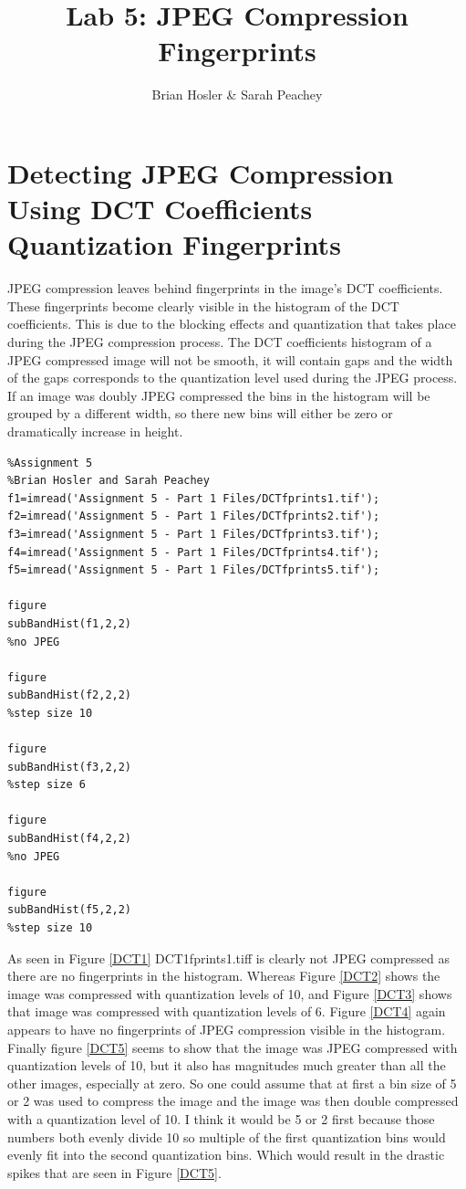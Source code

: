 \documentclass{article}
\begin{document}
\title{Lab 5: JPEG Compression Fingerprints}
\author{Brian Hosler \& Sarah Peachey }
\maketitle


\section{Detecting JPEG Compression Using DCT Coefficients Quantization
Fingerprints}

\qquad JPEG compression leaves behind fingerprints in the image's DCT coefficients.
These fingerprints become clearly visible in the histogram of the DCT coefficients. This
is due to the blocking effects and quantization that takes place during the JPEG compression
process. The DCT coefficients histogram of a JPEG compressed image will not
be smooth, it will contain gaps and the width of the gaps corresponds to the
quantization level used during the JPEG process. If an image was doubly JPEG
compressed the bins in the histogram will be grouped by a different width,
so there new bins will either be zero or dramatically increase in height. 

    
    \begin{verbatim}
%Assignment 5
%Brian Hosler and Sarah Peachey
f1=imread('Assignment 5 - Part 1 Files/DCTfprints1.tif');
f2=imread('Assignment 5 - Part 1 Files/DCTfprints2.tif');
f3=imread('Assignment 5 - Part 1 Files/DCTfprints3.tif');
f4=imread('Assignment 5 - Part 1 Files/DCTfprints4.tif');
f5=imread('Assignment 5 - Part 1 Files/DCTfprints5.tif');

figure
subBandHist(f1,2,2)
%no JPEG

figure
subBandHist(f2,2,2)
%step size 10

figure
subBandHist(f3,2,2)
%step size 6

figure
subBandHist(f4,2,2)
%no JPEG

figure
subBandHist(f5,2,2)
%step size 10
\end{verbatim}

\newpage 

As seen in Figure \ref{DCT1} DCT1fprints1.tiff is clearly not JPEG
compressed as there are no fingerprints in the histogram. Whereas Figure \ref{DCT2}
shows the image was compressed with quantization levels of 10, and Figure \ref{DCT3}
shows that image was compressed with quantization levels of 6. Figure
\ref{DCT4} again appears to have no fingerprints of JPEG compression visible
in the histogram. Finally figure \ref{DCT5} seems to show that the image was
JPEG compressed with quantization levels of 10, but it also has magnitudes
much greater than all the other images, especially at zero. So one could
assume that at first a bin size of 5 or 2 was used to compress the image and
the image was then double compressed with a quantization level of 10. I think
it would be 5 or 2 first because those numbers both evenly divide 10 so
multiple of the first quantization bins would evenly fit into the second
quantization bins. Which would result in the drastic spikes that are seen in
Figure \ref{DCT5}. 
\end{document}
